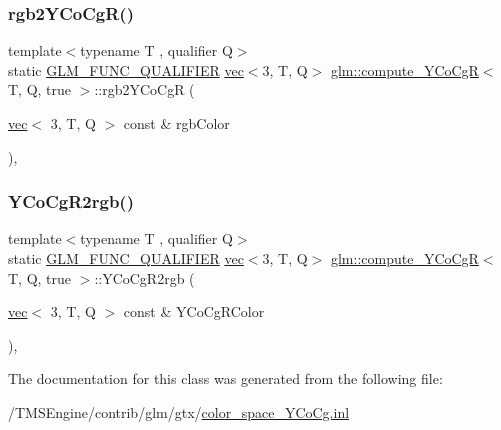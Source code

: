 \subsubsection{\texorpdfstring{rgb2\+Y\+Co\+Cg\+R()}{rgb2YCoCgR()}}
{\footnotesize\ttfamily template$<$typename T , qualifier Q$>$ \\
static \hyperlink{setup_8hpp_a33fdea6f91c5f834105f7415e2a64407}{G\+L\+M\+\_\+\+F\+U\+N\+C\+\_\+\+Q\+U\+A\+L\+I\+F\+I\+ER} \hyperlink{structglm_1_1vec}{vec}$<$3, T, Q$>$ \hyperlink{classglm_1_1compute___y_co_cg_r}{glm\+::compute\+\_\+\+Y\+Co\+CgR}$<$ T, Q, true $>$\+::rgb2\+Y\+Co\+CgR (\begin{DoxyParamCaption}\item[{\hyperlink{structglm_1_1vec}{vec}$<$ 3, T, Q $>$ const \&}]{rgb\+Color }\end{DoxyParamCaption})\hspace{0.3cm}{\ttfamily [inline]}, {\ttfamily [static]}}

\mbox{\label{classglm_1_1compute___y_co_cg_r_3_01_t_00_01_q_00_01true_01_4_aa5c06979ab1f4762a3d4528d55e9655d}} 
\subsubsection{\texorpdfstring{Y\+Co\+Cg\+R2rgb()}{YCoCgR2rgb()}}
{\footnotesize\ttfamily template$<$typename T , qualifier Q$>$ \\
static \hyperlink{setup_8hpp_a33fdea6f91c5f834105f7415e2a64407}{G\+L\+M\+\_\+\+F\+U\+N\+C\+\_\+\+Q\+U\+A\+L\+I\+F\+I\+ER} \hyperlink{structglm_1_1vec}{vec}$<$3, T, Q$>$ \hyperlink{classglm_1_1compute___y_co_cg_r}{glm\+::compute\+\_\+\+Y\+Co\+CgR}$<$ T, Q, true $>$\+::Y\+Co\+Cg\+R2rgb (\begin{DoxyParamCaption}\item[{\hyperlink{structglm_1_1vec}{vec}$<$ 3, T, Q $>$ const \&}]{Y\+Co\+Cg\+R\+Color }\end{DoxyParamCaption})\hspace{0.3cm}{\ttfamily [inline]}, {\ttfamily [static]}}



The documentation for this class was generated from the following file\+:\begin{DoxyCompactItemize}
\item 
/\+T\+M\+S\+Engine/contrib/glm/gtx/\hyperlink{color__space___y_co_cg_8inl}{color\+\_\+space\+\_\+\+Y\+Co\+Cg.\+inl}\end{DoxyCompactItemize}
